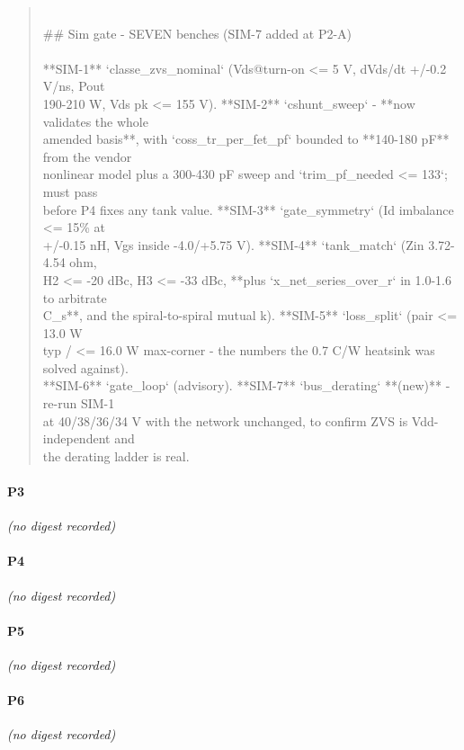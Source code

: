 \documentclass[11pt,a4paper]{article}
\begin{document}
\begin{quote}
~\\
\#\# Sim gate - SEVEN benches (SIM-7 added at P2-A)\\
~\\
{*}{*}SIM-1{*}{*} `classe\_zvs\_nominal` (Vds@turn-on \textless{}= 5 V, dVds/dt +/-0.2 V/ns, Pout\\
190-210 W, Vds pk \textless{}= 155 V). {*}{*}SIM-2{*}{*} `cshunt\_sweep` - {*}{*}now validates the whole\\
amended basis{*}{*}, with `coss\_tr\_per\_fet\_pf` bounded to {*}{*}140-180 pF{*}{*} from the vendor\\
nonlinear model plus a 300-430 pF sweep and `trim\_pf\_needed \textless{}= 133`; must pass\\
before P4 fixes any tank value. {*}{*}SIM-3{*}{*} `gate\_symmetry` (Id imbalance \textless{}= 15\% at\\
+/-0.15 nH, Vgs inside -4.0/+5.75 V). {*}{*}SIM-4{*}{*} `tank\_match` (Zin 3.72-4.54 ohm,\\
H2 \textless{}= -20 dBc, H3 \textless{}= -33 dBc, {*}{*}plus `x\_net\_series\_over\_r` in 1.0-1.6 to arbitrate\\
C\_s{*}{*}, and the spiral-to-spiral mutual k). {*}{*}SIM-5{*}{*} `loss\_split` (pair \textless{}= 13.0 W\\
typ / \textless{}= 16.0 W max-corner - the numbers the 0.7 C/W heatsink was solved against).\\
{*}{*}SIM-6{*}{*} `gate\_loop` (advisory). {*}{*}SIM-7{*}{*} `bus\_derating` {*}{*}(new){*}{*} - re-run SIM-1\\
at 40/38/36/34 V with the network unchanged, to confirm ZVS is Vdd-independent and\\
the derating ladder is real.
\end{quote}
\paragraph*{P3}
\emph{(no digest recorded)}
\paragraph*{P4}
\emph{(no digest recorded)}
\paragraph*{P5}
\emph{(no digest recorded)}
\paragraph*{P6}
\emph{(no digest recorded)}
\end{document}
